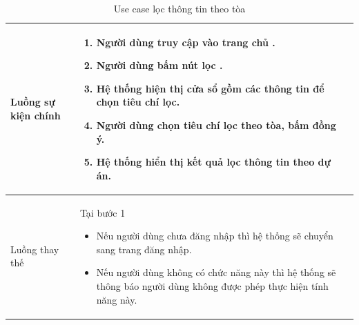 \documentclass[12pt,a4paper]{article}
\begin{document}
\begin{table}[H]
\begin{tabular}{|p{3.5cm}|p{11.5cm}|c|}
            Luồng sự kiện chính & \vspace{-.8cm}\begin{enumerate}
                                                    \item Người dùng truy cập vào trang chủ .
                                                    \item Người dùng bấm nút lọc .
                                                    \item Hệ thống hiện thị cửa sổ gồm các thông tin để chọn tiêu chí lọc.
                                                    \item Người dùng chọn tiêu chí lọc theo tòa, bấm đồng ý.
                                                    \item Hệ thống hiển thị kết quả lọc thông tin theo dự án.
            \end{enumerate}
            \\
            \hline
            Luồng thay thế & Tại bước 1\newline
            \vspace{-.8cm}\begin{itemize}
                              \item Nếu người dùng chưa đăng nhập thì hệ thống sẽ chuyển sang trang đăng nhập.
                              \item Nếu người dùng không có chức năng này thì hệ thống sẽ thông báo người dùng không được phép thực hiện tính năng này.
            \end{itemize}

            \\ \hline
        \end{tabular}
        \caption{Use case lọc thông tin theo tòa}

    \end{table}


\end{document}
